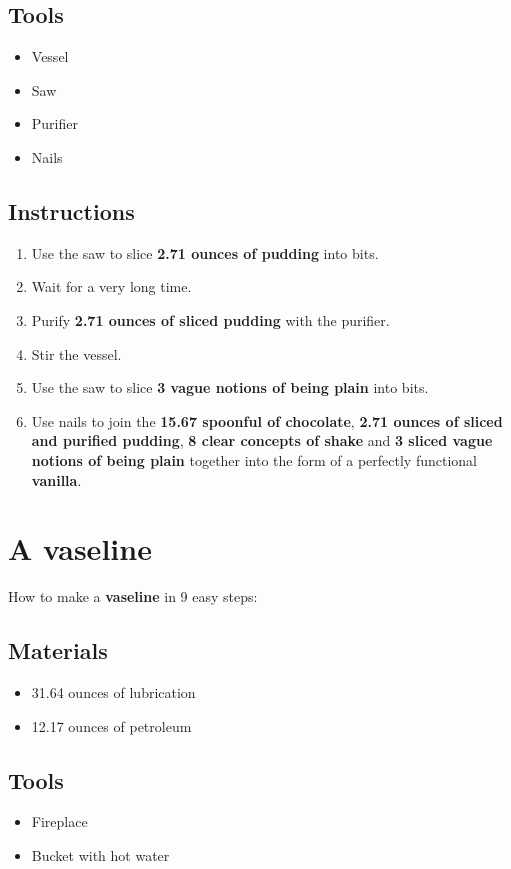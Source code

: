\documentclass{article}
\begin{document}
\subsection{Tools}\begin{itemize}
\item 
Vessel
\item 
Saw
\item 
Purifier
\item 
Nails
\end{itemize}
\subsection{Instructions}\begin{enumerate}
\item 
Use the saw to slice \textbf{2.71 ounces of pudding} into bits.
\item 
Wait for a very long time.
\item 
Purify \textbf{2.71 ounces of sliced pudding} with the purifier.
\item 
Stir the vessel.
\item 
Use the saw to slice \textbf{3 vague notions of being plain} into bits.
\item 
Use nails to join the \textbf{15.67 spoonful of chocolate}, \textbf{2.71 ounces of sliced and purified pudding}, \textbf{8 clear concepts of shake} and \textbf{3 sliced vague notions of being plain} together into the form of a perfectly functional \textbf{vanilla}.
\end{enumerate}
\newpage
\section{A vaseline}How to make a \textbf{vaseline} in 9 easy steps:

\subsection{Materials}\begin{itemize}
\item 
31.64 ounces of lubrication
\item 
12.17 ounces of petroleum
\end{itemize}
\subsection{Tools}\begin{itemize}
\item 
Fireplace
\item 
Bucket with hot water
\end{itemize}
\end{document}
